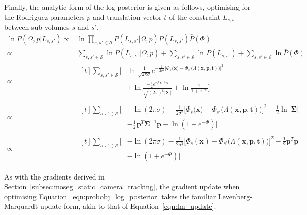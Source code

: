 Finally, the analytic form of the log-posterior is given as follows, optimising
for the Rodriguez parameters \(p\) and translation vector \(t\) of the constraint
\(L_{s, s'}\) between sub-volumes \(s\) and \(s'\).
\begin{align}
\label{eqn:probobj_log_posterior}
  \ln P(\Omega, p | L_{s, s'}) \propto{}& \ln
  \prod_{s, s' \in \mathcal{S}} P(L_{s, s'} | \Omega, p)P(L_{s, s'})\bar{P}(\Phi)\\
  \propto& \sum_{s, s' \in \mathcal{S}} \ln P(L_{s, s'} | \Omega, p) +
  \sum_{s, s' \in \mathcal{S}} \ln P(L_{s, s'}) +
  \sum_{s, s' \in \mathcal{S}} \ln \bar{P}(\Phi)\\
  \propto& 
  \begin{aligned}[t]
    \sum_{s, s' \in \mathcal{S}} \Bigg[ {}& \ln \frac{1}{\sqrt{2 \pi \sigma}}
    e^{-\frac{1}{2\sigma^{2}}\Big[
        \Phi_{s}\big(\bm{x}\big) - \Phi_{s'} \big(\Lambda(\bm{x}, \bm{p}, \bm{t})\big){ 
      \Big ] }^{2}
    }\\
    &+ \ln \frac{-\frac{1}{2} e^{\bm{p}^{T}\bm{\Sigma}^{-1}\bm{p}}}
    {\sqrt{{(2\pi)}^{k}\left|\bm{\Sigma}\right|}} +
    \ln \frac{1}{1 + e^{-\Phi}}\Bigg]
  \end{aligned}\\
  \propto& 
  \begin{aligned}[t]
    \sum_{s, s' \in \mathcal{S}} \Bigg[ {}& -\ln(2\pi\sigma) -
    \frac{1}{2\sigma^{2}}{\Big[
      \Phi_{s}\big(\bm{x}\big) - \Phi_{s'}\big(\Lambda(\bm{x}, \bm{p}, \bm{t})\big)
    \Big]}^{2} -
    \frac{1}{2} \ln \left|\bm{\Sigma}\right| \\
    & - \frac{1}{2} \bm{p}^{T}\bm{\Sigma}^{-1}\bm{p} -
    \ln(1 + e^{-\Phi}) \Bigg]
  \end{aligned}\\
  \propto& 
  \begin{aligned}[t]
    \sum_{s, s' \in \mathcal{S}} \Bigg[ {}& -\ln(2\pi\sigma) -
    \frac{1}{2\sigma^{2}}{\Big[
      \Phi_{s}(\bm{x}) - \Phi_{s'}\big(\Lambda(\bm{x}, \bm{p}, \bm{t})\big)
    \Big]}^{2} -
    \frac{1}{2} \bm{p}^{T}\bm{p} \\
    & - \ln(1 + e^{-\Phi}) \Bigg]
\end{aligned}
\end{align}

As with the gradients derived in Section~\ref{subsec:moseg_static_camera_tracking}, the 
gradient update when optimising Equation~\ref{eqn:probobj_log_posterior} takes the familiar 
Levenberg-Marquardt update form, akin to that of Equation~\ref{eqn:lm_update}.


